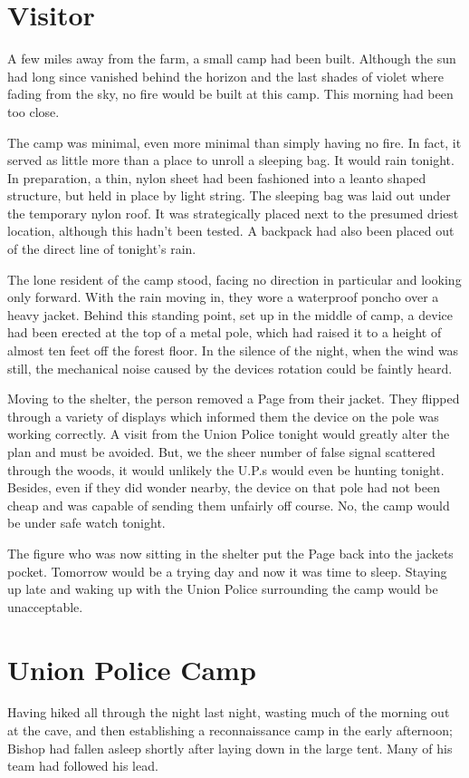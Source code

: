 \documentclass[courier]{sffms}
\begin{document}
\chapter{Visitor}
A few miles away from the farm, a small camp had been
built. Although the sun had long since vanished behind the horizon
and the last shades of violet where fading from the sky,
no fire would be built at this camp. This morning had been
too close.

The camp was minimal, even more minimal than simply
having no fire. In fact, it served as little more than a
place to unroll a sleeping bag. It would rain tonight.
In preparation, a thin, nylon sheet had been fashioned
into a leanto shaped structure, but held in place by light
string. The sleeping bag was laid out under the
temporary nylon roof. It was strategically placed next to
the presumed driest location, although this hadn't been
tested. A backpack had also been placed out of the
direct line of tonight's rain.

The lone resident of the camp stood, facing no direction
in particular and looking only forward. With the rain
moving in, they wore a waterproof poncho over a heavy
jacket. Behind this standing point, set up in the middle
of camp, a device had been erected at the top of a
metal pole, which had raised it to a height of almost ten
feet off the forest floor. In the silence of the night, when
the wind was still, the mechanical noise caused by
the devices rotation
could be faintly heard.

Moving to the shelter, the person removed a Page from
their jacket. They flipped through a variety of displays
which informed them the device on the pole was working
correctly. A visit from the Union Police tonight would
greatly alter the plan and must be avoided. But, we the
sheer number of false signal scattered through the woods,
it would unlikely the U.P.s would even be hunting tonight.
Besides, even if they did wonder nearby, the device on that
pole had not been cheap and was capable of sending them
unfairly off course. No, the camp would be under safe
watch tonight.

The figure who was now sitting in the shelter put the Page
back into the jackets pocket. Tomorrow would be
a trying day and now it was time to sleep. Staying up
late and waking up with the Union Police surrounding
the camp would be unacceptable.

\chapter{Union Police Camp}
Having hiked all through the night last night, wasting
much of the morning out at the cave, and then
establishing a reconnaissance camp in the early afternoon;
Bishop had fallen asleep shortly after laying down in the
large tent. Many of his team had followed his lead.
\end{document}
